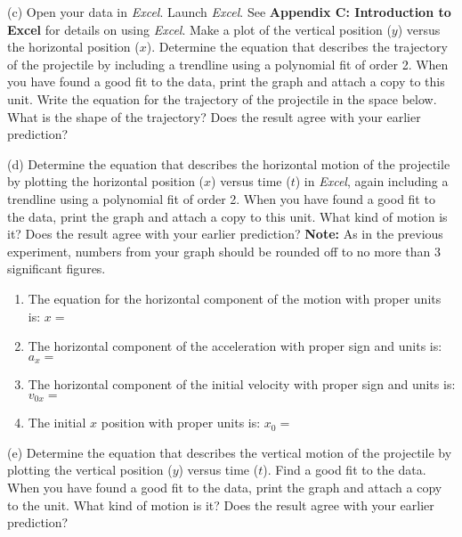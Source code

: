 (c) Open your data in \textit{Excel}.
Launch \textit{Excel}. 
See \textbf{Appendix C: Introduction to Excel} for details on using
\textit{Excel}. Make a plot of the vertical position ($y$) versus the
horizontal position ($x$). Determine the equation that describes the trajectory
of the projectile by including a trendline using a polynomial fit of order 2.
 When you have found a good fit to the data, print the graph
and attach a copy to this unit. Write the equation for the trajectory of the
projectile in the space below. What is the shape of the trajectory? Does the
result agree with your earlier prediction?
\vspace{20mm}

(d) Determine the equation that describes the horizontal motion of the 
projectile by plotting the horizontal position ($x$) versus time ($t$) in 
\textit{Excel}, again including a trendline using a polynomial fit of order 2.
 When you have found a good fit to the data, print the graph and attach a copy 
to this unit. What kind of motion is it? Does the result agree with your 
earlier prediction?
\textbf{Note:} As in the previous experiment, numbers from your graph should be rounded off to no more than 3 significant figures.
\vspace{8mm}

\begin{enumerate}
\item The equation for the horizontal component of the motion with proper units is:
$x =$\vspace{5mm}

\item The horizontal component of the acceleration with proper sign and units is:
\( a_{x}= \) \vspace{5mm}

\item The horizontal component of the initial velocity with proper sign and units
is: \( v_{0x}= \)\vspace{5mm}

\item The initial $x$ position with proper units is: \( x_{0}= \)\vspace{5mm}

\end{enumerate}
(e) Determine the equation that describes the vertical motion of the projectile
by plotting the vertical position ($y$) versus time ($t$). Find a good fit to the
data. When you have found a good fit to the data, print the graph and attach
a copy to the unit. What kind of motion is it? Does the result agree with your
earlier prediction?
\vspace{20mm}

